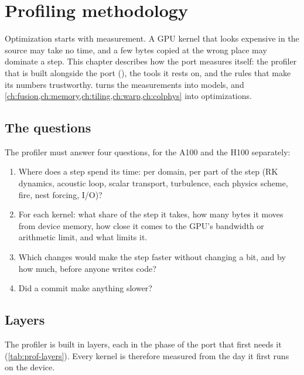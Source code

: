 \chapter{Profiling methodology}\label{ch:prof}

Optimization starts with measurement. A GPU kernel that looks expensive in the source may take no time, and a few
bytes copied at the wrong place may dominate a step. This chapter describes how the port measures itself: the
profiler that is built alongside the port (), the tools it rests on, and the rules
that make its numbers trustworthy.  turns the measurements into models, and
\cref{ch:fusion,ch:memory,ch:tiling,ch:warp,ch:colphys} into optimizations.

\section{The questions}

The profiler must answer four questions, for the A100 and the H100 separately:
\begin{enumerate}
  \item Where does a step spend its time: per domain, per part of the step (RK dynamics, acoustic loop, scalar
    transport, turbulence, each physics scheme, fire, nest forcing, I/O)?
  \item For each kernel: what share of the step it takes, how many bytes it moves from device memory, how close it
    comes to the GPU's bandwidth or arithmetic limit, and what limits it.
  \item Which changes would make the step faster without changing a bit, and by how much, before anyone writes code?
  \item Did a commit make anything slower?
\end{enumerate}

\section{Layers}

The profiler is built in layers, each in the phase of the port that first needs it (\cref{tab:prof-layers}). Every
kernel is therefore measured from the day it first runs on the device.

